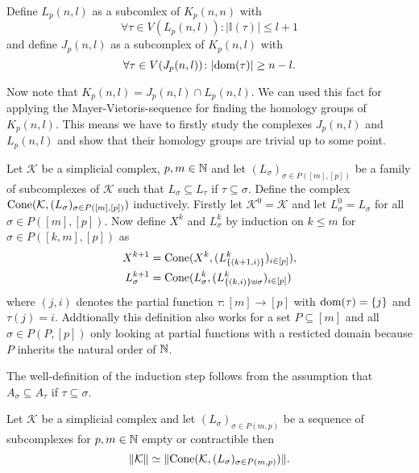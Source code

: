 \begin{defin}
  Define $L_p(n,l)$ as a subcomlex of $K_p(n,n)$ with \[\forall\tau\in V(L_p(n,l))\colon |\mathbb{I}(\tau)| \leq l+1 \]
  and define $J_p(n,l)$ as a subcomplex of $K_p(n,l)$ with \[\forall \tau \in V(J_p(n,l))\colon |{\rm dom}(\tau)| \geq n-l.\]
\end{defin}

Now note that $K_p(n,l) = J_p(n,l) \cap L_p(n,l)$. We can used this fact for applying the Mayer-Vietoris-sequence for finding the homology groups of $K_p(n,l)$. This means we have to firstly study the complexes $J_p(n,l)$ and $L_p(n,l)$ and show that their homology groups are trivial up to some point.

\begin{defin}
  Let $\mathcal{K}$ be a simplicial complex, $p,m \in \mathbb{N}$ and let $(L_\sigma)_{\sigma \in P([m],[p])}$ be a family of subcomplexes of $\mathcal{K}$ such that $L_\sigma \subseteq L_\tau$ if $\tau \subseteq \sigma$. Define the complex ${\rm Cone}(\mathcal{K}, (L_\sigma)_{\sigma\in P([m],[p])})$ inductively. Firstly let $\mathcal{K}^0 = \mathcal{K}$ and let $L_\sigma^0 = L_\sigma$ for all $\sigma \in P([m],[p])$. Now define $X^k$ and $L_\sigma^k$ by induction on $k \leq m$ for $\sigma \in P([k,m], [p])$ as
  \begin{align*}
    X^{k+1} &= {\rm Cone}(X^k, (L^k_{\{(k+1,i)\}})_{i\in [p]}), \\
    L^{k+1}_\sigma &= {\rm Cone}(L^k_\sigma, (L^k_{\{(k,i)\}\uplus \sigma})_{i\in [p]})
  \end{align*}
  where $(j,i)$ denotes the partial function $\tau\colon [m] \to [p]$ with ${\rm dom}(\tau) = \{j\}$ and $\tau(j) = i$.
  Addtionally this definition also works for a set $P \subseteq [m]$ and all $\sigma \in P(P, [p])$ only looking at partial functions with a resticted domain because $P$ inherits the natural order of $\mathbb{N}$.
\end{defin}

The well-definition of the induction step follows from the assumption that $A_\sigma \subseteq A_\tau$ if $\tau \subseteq \sigma$.

\begin{lemma}\label{lem:ecsimeq}
  Let $\mathcal{K}$ be a simplicial complex and let $(L_\sigma)_{\sigma \in P(m,p)}$ be a sequence of subcomplexes for $p,m \in \mathbb{N}$ empty or contractible then \[\lVert \mathcal{K} \rVert \simeq \lVert {\rm Cone}(\mathcal{K}, (L_\sigma)_{\sigma \in P(m,p)})\rVert.\]  
\end{lemma}

